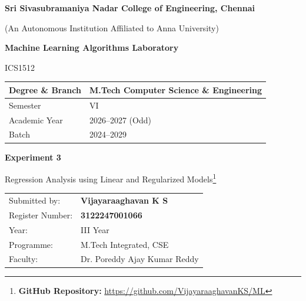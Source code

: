 \documentclass[11pt,a4paper]{article}
\title{}
\date{}
\begin{document}
\begin{titlepage}
\centering
\vspace*{1cm}
{\Large\bfseries Sri Sivasubramaniya Nadar College of Engineering, Chennai\par}
\vspace{0.2cm}
{\normalsize (An Autonomous Institution Affiliated to Anna University)\par}
\vspace{1.2cm}

{\Large\bfseries Machine Learning Algorithms Laboratory\par}
\vspace{0.3cm}
{\large ICS1512\par}
\vspace{1.5cm}

\begin{tabular}{|p{5.5cm}|p{7cm}|}
\hline
Degree \& Branch & M.Tech Computer Science \& Engineering \\
\hline
Semester & VI \\
\hline
Academic Year & 2026--2027 (Odd) \\
\hline
Batch & 2024--2029 \\
\hline
\end{tabular}

\vspace{1.8cm}
{\Large\bfseries Experiment 3\par}
\vspace{0.3cm}
{\large Regression Analysis using Linear and Regularized Models\footnote{\textbf{GitHub Repository: }\url{https://github.com/VijayaraaghavanKS/ML}}\par}
\vspace{2.5cm}

\begin{tabular}{ll}
Submitted by: & \textbf{Vijayaraaghavan K S} \\[4pt]
Register Number: & \textbf{3122247001066} \\[4pt]
Year: & III Year \\[4pt]
Programme: & M.Tech Integrated, CSE \\[4pt]
Faculty: & Dr. Poreddy Ajay Kumar Reddy \\[4pt]
\end{tabular}

\vfill
\end{titlepage}

\tableofcontents
\newpage

\end{document}
